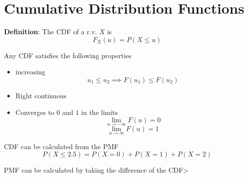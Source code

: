 \section{Cumulative Distribution Functions}

\begin{framed}
   \textbf{Definition}: The CDF of a r.v. $X$ is 
   \[
     F_X (u)  = P(X \leq u)
   \] 

   Any CDF satisfies the following properties
   \begin{itemize}
      \item increasing
         \[
           u_1 \leq u_2 \implies F(u_1 ) \leq F(u_2)
         \] 
      \item Right continuous
      \item Converges to $0$ and $1$ in the limits
         \[
            \lim_{u \to -\infty} F(u) = 0
         \] 
         \[
            \lim_{u \to \infty} F(u) = 1
         \] 
   \end{itemize}

   CDF can be calculated from the PMF
   \[
     P(X \leq 2.5) = P(X = 0) + P(X = 1) + P(X = 2) 
   \] 

   PMF can be calculated by taking the difference of the CDF>
\end{framed}


